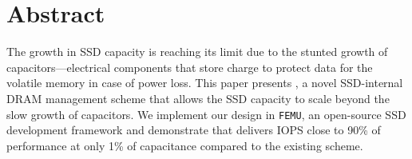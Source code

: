\section*{Abstract}
The growth in SSD capacity is reaching its limit 
due to the stunted growth of capacitors---electrical components that store charge 
to protect data for the volatile memory in case of power loss. 
This paper presents \ours{}, a novel SSD-internal DRAM management scheme 
that allows the SSD capacity to scale beyond the slow growth of capacitors. 
We implement our design in \texttt{FEMU}, an open-source SSD development framework
and demonstrate that \ours{} delivers IOPS close to 90\% of performance at only 1\% of capacitance compared to the existing scheme. 
